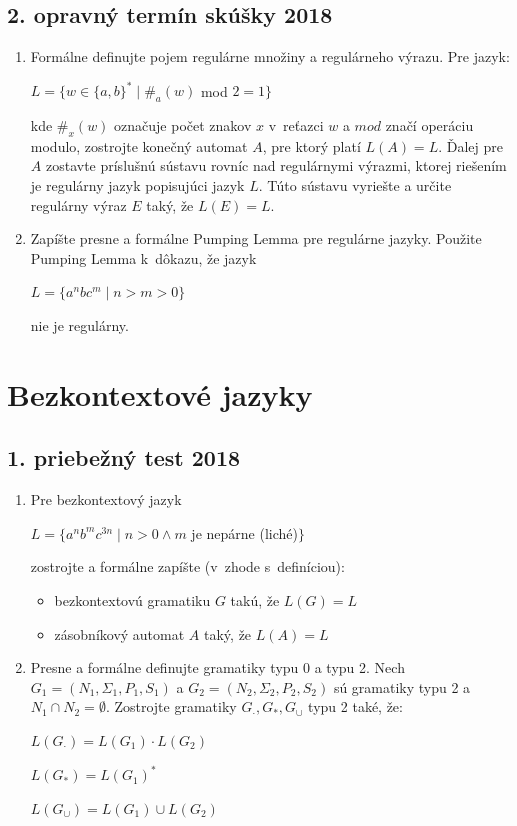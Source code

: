 \documentclass[11pt,a4paper]{article}
\begin{document}
		\subsection{2. opravný termín skúšky 2018}
		
		\begin{enumerate}
			\item Formálne definujte pojem regulárne množiny a regulárneho výrazu. Pre jazyk:
			
			$L = \{w \in \{a,b\}^* \mid \#_a(w)$ mod $2 = 1\}$
			
			kde $\#_x(w)$ označuje počet znakov $x$ v~reťazci $w$ a $mod$ značí operáciu modulo, zostrojte konečný automat $A$, pre ktorý platí $L(A) = L$. Ďalej pre $A$ zostavte príslušnú sústavu rovníc nad regulárnymi výrazmi, ktorej riešením  je regulárny jazyk popisujúci jazyk $L$. Túto sústavu vyriešte a určite regulárny výraz $E$ taký, že $L(E) = L$.
			
			\item Zapíšte presne a formálne Pumping Lemma pre regulárne jazyky. Použite Pumping Lemma k~dôkazu, že jazyk
			
			$L = \{a^nbc^m \mid n > m > 0\}$
			
			nie je regulárny.
		\end{enumerate}

	\section{Bezkontextové jazyky}

		\subsection{1. priebežný test 2018}

		\begin{enumerate}
			\item Pre bezkontextový jazyk
	
			$L = \{a^nb^mc^{3n} \mid n > 0 \land m$ je nepárne (liché)$\}$
	
			zostrojte a formálne zapíšte (v~zhode s~definíciou):
			\begin{itemize}
				\item bezkontextovú gramatiku $G$ takú, že $L(G) = L$
				\item zásobníkový automat $A$ taký, že $L(A) = L$
			\end{itemize}
	
			\item Presne a formálne definujte gramatiky typu 0 a typu 2. Nech $G_1 = (N_1, \Sigma_1, P_1, S_1)$ a $G_2 = (N_2, \Sigma_2, P_2, S_2)$ sú gramatiky typu 2 a $N_1 \cap N_2 = \emptyset$. Zostrojte gramatiky $G_{\cdot}, G_*, G_{\cup}$ typu 2 také, že:
	
			$L(G_{\cdot}) = L(G_1) \cdot L(G_2)$
	
			$L(G_{*}) = L(G_1)^*$
	
			$L(G_{\cup}) = L(G_1) \cup L(G_2)$
		\end{enumerate}
\end{document}
